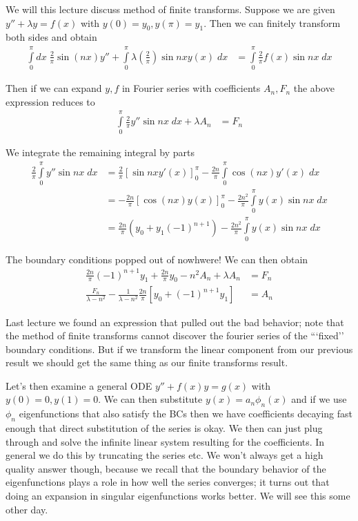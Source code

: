 \documentclass[10pt]{report}
\begin{document}
We will this lecture discuss method of finite transforms. Suppose we are given $y'' + \lambda y = f(x)$ with $y(0) = y_0, y(\pi) = y_1$. Then we can finitely transform both sides and obtain
\begin{align}
    \displaystyle\int\limits_{0}^{\pi}dx\;\frac{2}{\pi}\sin(nx) y'' + \displaystyle\int\limits_{0}^{\pi}\lambda \left( \frac{2}{\pi} \right)\sin nx y(x)\;dx &= \displaystyle\int\limits_{0}^{\pi}\frac{2}{\pi}f(x)\sin nx\;dx
\end{align}

Then if we can expand $y,f$ in Fourier series with coefficients $A_n, F_n$ the above expression reduces to
\begin{align}
    \displaystyle\int\limits_{0}^{\pi}\frac{2}{\pi}y''\sin nx\;dx + \lambda A_n &= F_n
\end{align}

We integrate the remaining integral by parts
\begin{align}
    \frac{2}{\pi}\displaystyle\int\limits_{0}^{\pi}y''\sin nx\;dx &= \frac{2}{\pi}\left[ \sin nx y'(x) \right]_0^\pi - \frac{2n}{\pi}\displaystyle\int\limits_{0}^{\pi}\cos(nx)y'(x)\;dx\\
    &= -\frac{2n}{\pi}\left[ \cos(nx)y(x) \right]_0^\pi - \frac{2n^2}{\pi}\displaystyle\int\limits_{0}^{\pi}y(x)\sin nx\;dx\\
    &= \frac{2n}{\pi}\left( y_0 + y_1(-1)^{n+1} \right) - \frac{2n^2}{\pi}\displaystyle\int\limits_{0}^{\pi}y(x)\sin nx\;dx
\end{align}

The boundary conditions popped out of nowhwere! We can then obtain
\begin{align}
    \frac{2n}{\pi}\left( -1 \right)^{n+1}y_1 + \frac{2n}{\pi}y_0 - n^2A_n + \lambda A_n &= F_n\\
    \frac{F_n}{\lambda - n^2} - \frac{1}{\lambda - n^2}\frac{2n}{\pi}\left[ y_0 + \left( -1 \right)^{n+1} y_1 \right] &= A_n
\end{align}

Last lecture we found an expression that pulled out the bad behavior; note that the method of finite transforms cannot discover the fourier series of the ```fixed'' boundary conditions. But if we transform the linear component from our previous result we should get the same thing as our finite transforms result. 

Let's then examine a general ODE $y'' + f(x) y = g(x)$ with $y(0) = 0, y(1) = 0$. We can then substitute $y(x) = a_n \phi_n(x)$ and if we use $\phi_n$ eigenfunctions that also satisfy the BCs then we have coefficients decaying fast enough that direct substitution of the series is okay. We then can just plug through and solve the infinite linear system resulting for the coefficients. In general we do this by truncating the series etc. We won't always get a high quality answer though, because we recall that the boundary behavior of the eigenfunctions plays a role in how well the series converges; it turns out that doing an expansion in singular eigenfunctions works better. We will see this some other day. 
\end{document}
